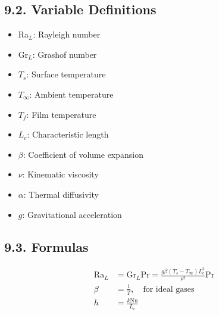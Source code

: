 \begin{multicols*}{2}
\subsection*{9.2. Variable Definitions}
\begin{itemize}
    \item Ra$_L$: Rayleigh number
    \item Gr$_L$: Grashof number
    \item $T_s$: Surface temperature
    \item $T_\infty$: Ambient temperature
    \item $T_f$: Film temperature
    \item $L_c$: Characteristic length
    \item $\beta$: Coefficient of volume expansion
    \item $\nu$: Kinematic viscosity
    \item $\alpha$: Thermal diffusivity
    \item $g$: Gravitational acceleration
\end{itemize}

\subsection*{9.3. Formulas}
\begin{align*}
    \text{Ra}_L &= \text{Gr}_L \text{Pr} = \frac{g \beta (T_s - T_\infty) L_c^3}{\nu^2} \text{Pr} \\
    \beta &= \frac{1}{T}, \quad \text{for ideal gases} \\
    h &= \frac{k \text{Nu}}{L_c} 
\end{align*}

\end{multicols*}
